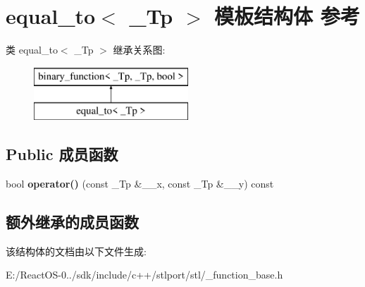\hypertarget{structequal__to}{}\section{equal\+\_\+to$<$ \+\_\+\+Tp $>$ 模板结构体 参考}
\label{structequal__to}
类 equal\+\_\+to$<$ \+\_\+\+Tp $>$ 继承关系图\+:\begin{figure}[H]
\begin{center}
\leavevmode
\includegraphics[height=2.000000cm]{structequal__to}
\end{center}
\end{figure}
\subsection*{Public 成员函数}
\begin{DoxyCompactItemize}
\item 
\mbox{\label{structequal__to_a5457028fc250ab8a1c7115ec9ba08d39}} 
bool {\bfseries operator()} (const \+\_\+\+Tp \&\+\_\+\+\_\+x, const \+\_\+\+Tp \&\+\_\+\+\_\+y) const
\end{DoxyCompactItemize}
\subsection*{额外继承的成员函数}


该结构体的文档由以下文件生成\+:\begin{DoxyCompactItemize}
\item 
E\+:/\+React\+O\+S-\/0../sdk/include/c++/stlport/stl/\+\_\+function\+\_\+base.\+h\end{DoxyCompactItemize}
